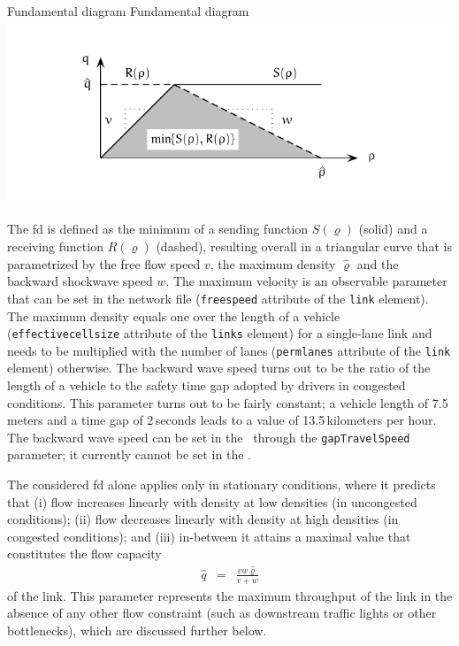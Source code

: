 \createfigure%
{Fundamental diagram}%
{Fundamental diagram}%
{\label{fig:Fundamental-diagram}}%
{\includegraphics[width=0.99\textwidth, angle=0]{understanding/figures/waves/fig0.pdf}}%
{}

The \gls{fd} is defined as the minimum of a sending function $S(\varrho)$
(solid) and a receiving function $R(\varrho)$ (dashed), resulting
overall in a triangular curve that is parametrized by the free flow speed $v$, 
the maximum density $\hat{\varrho}$ and the
backward shockwave speed $w$. The maximum velocity is an observable
parameter that can be set in the network file (\texttt{freespeed}
attribute of the \texttt{link} element). The maximum density equals
one over the length of a vehicle (\texttt{effectivecellsize} attribute
of the \texttt{links} element) for a single-lane link and needs to
be multiplied with the number of lanes (\texttt{permlanes} attribute
of the \texttt{link} element) otherwise. The backward wave speed turns
out to be the ratio of the length of a vehicle to the safety time
gap adopted by drivers in congested conditions. This parameter turns
out to be fairly constant; a vehicle length of 7.5\,meters and a time
gap of 2\,seconds leads to a value of 13.5\,kilometers per hour. 
The backward wave speed can be set in the \DOUBLEQUEUESIM\ through the
\lstinline|gapTravelSpeed| parameter; it currently cannot be set in the
\SINGLEQUEUESIM. 

The considered \gls{fd} alone applies only in stationary conditions, where
it predicts that (i) flow increases linearly with density at low densities
(\ie in uncongested conditions); (ii) flow decreases linearly with
density at high densities (\ie in congested conditions); and (iii)
in-between it attains a maximal value that constitutes the flow capacity
\begin{eqnarray}
\hat{q} & = & \frac{vw\hat{\varrho}}{v+w}\label{eq:flow-cap}
\end{eqnarray}
 of the link. This parameter represents the maximum throughput of
the link in the absence of any other flow constraint (such as downstream
traffic lights or other bottlenecks), which are discussed further
below.

